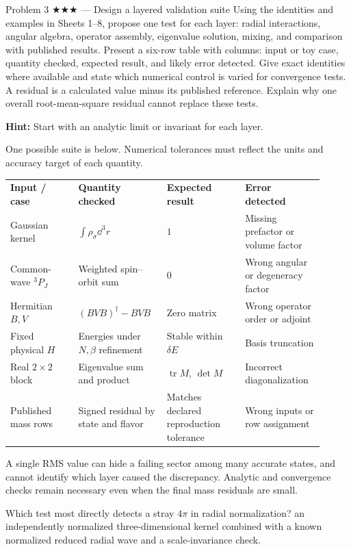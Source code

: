 \documentclass[11pt]{article}
\begin{document}
\begin{problem}{Problem 3 ★★★ — Design a layered validation suite}
Using the identities and examples in Sheets 1--8, propose one test for each
layer: radial interactions, angular algebra, operator assembly, eigenvalue
solution, mixing, and comparison with published results.
Present a six-row table with columns: input or toy case, quantity checked,
expected result, and likely error detected. Give exact identities where
available and state which numerical control is varied for convergence tests.
A residual is a calculated value minus its published reference.
Explain why one overall root-mean-square residual cannot replace these tests.

\textbf{Hint:} Start with an analytic limit or invariant for each layer.
\end{problem}
\begin{solution}
One possible suite is below. Numerical tolerances must reflect the units and
accuracy target of each quantity.

{\small
\begin{tabular}{@{}p{0.20\linewidth}p{0.25\linewidth}p{0.23\linewidth}p{0.23\linewidth}@{}}
\textbf{Input / case} & \textbf{Quantity checked} & \textbf{Expected result} & \textbf{Error detected} \\[3pt]
Gaussian kernel & $\int\rho_\sigma\dd^3r$ & $1$ & Missing prefactor or volume factor \\[5pt]
Common-wave $^3P_J$ & Weighted spin--orbit sum & $0$ & Wrong angular or degeneracy factor \\[5pt]
Hermitian $B,V$ & $(BVB)^\dagger-BVB$ & Zero matrix & Wrong operator order or adjoint \\[5pt]
Fixed physical $H$ & Energies under $N,\beta$ refinement & Stable within $\delta E$ & Basis truncation \\[5pt]
Real $2\times2$ block & Eigenvalue sum and product & $\operatorname{tr}M$, $\det M$ & Incorrect diagonalization \\[5pt]
Published mass rows & Signed residual by state and flavor & Matches declared reproduction tolerance & Wrong inputs or row assignment
\end{tabular}}

A single RMS value can hide a failing sector among many accurate states,
and cannot identify which layer caused the discrepancy. Analytic and
convergence checks remain necessary even when the final mass residuals are small.
\end{solution}
\begin{quiz}
Which test most directly detects a stray $4\pi$ in radial normalization?
\answer an independently normalized three-dimensional kernel combined with a
known normalized reduced radial wave and a scale-invariance check.
\end{quiz}
\end{document}
